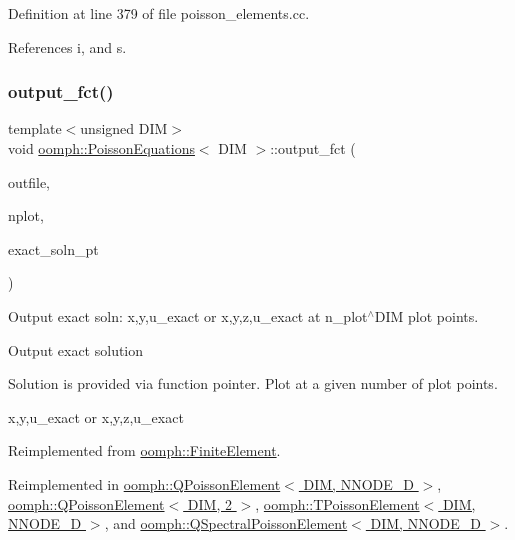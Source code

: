 Definition at line 379 of file poisson\+\_\+elements.\+cc.



References i, and s.

\mbox{\label{classoomph_1_1PoissonEquations_ad6c637c8a5221313c2220e8e8c27ec42}} 
\subsubsection{\texorpdfstring{output\+\_\+fct()}{output\_fct()}\hspace{0.1cm}{\footnotesize\ttfamily [1/2]}}
{\footnotesize\ttfamily template$<$unsigned D\+IM$>$ \\
void \hyperlink{classoomph_1_1PoissonEquations}{oomph\+::\+Poisson\+Equations}$<$ D\+IM $>$\+::output\+\_\+fct (\begin{DoxyParamCaption}\item[{std\+::ostream \&}]{outfile,  }\item[{const unsigned \&}]{nplot,  }\item[{\hyperlink{classoomph_1_1FiniteElement_a690fd33af26cc3e84f39bba6d5a85202}{Finite\+Element\+::\+Steady\+Exact\+Solution\+Fct\+Pt}}]{exact\+\_\+soln\+\_\+pt }\end{DoxyParamCaption})\hspace{0.3cm}{\ttfamily [virtual]}}



Output exact soln\+: x,y,u\+\_\+exact or x,y,z,u\+\_\+exact at n\+\_\+plot$^\wedge$\+D\+IM plot points. 

Output exact solution

Solution is provided via function pointer. Plot at a given number of plot points.

x,y,u\+\_\+exact or x,y,z,u\+\_\+exact 

Reimplemented from \hyperlink{classoomph_1_1FiniteElement_a22b695c714f60ee6cd145be348042035}{oomph\+::\+Finite\+Element}.



Reimplemented in \hyperlink{classoomph_1_1QPoissonElement_a42738c2ce76bf1abc782c51b6c775904}{oomph\+::\+Q\+Poisson\+Element$<$ D\+I\+M, N\+N\+O\+D\+E\+\_\+D $>$}, \hyperlink{classoomph_1_1QPoissonElement_a42738c2ce76bf1abc782c51b6c775904}{oomph\+::\+Q\+Poisson\+Element$<$ D\+I\+M, 2 $>$}, \hyperlink{classoomph_1_1TPoissonElement_a69344016c42eb40d39a0061175a6db94}{oomph\+::\+T\+Poisson\+Element$<$ D\+I\+M, N\+N\+O\+D\+E\+\_\+D $>$}, and \hyperlink{classoomph_1_1QSpectralPoissonElement_a112f8c43964b2514296974a90dc4b587}{oomph\+::\+Q\+Spectral\+Poisson\+Element$<$ D\+I\+M, N\+N\+O\+D\+E\+\_\+D $>$}.



